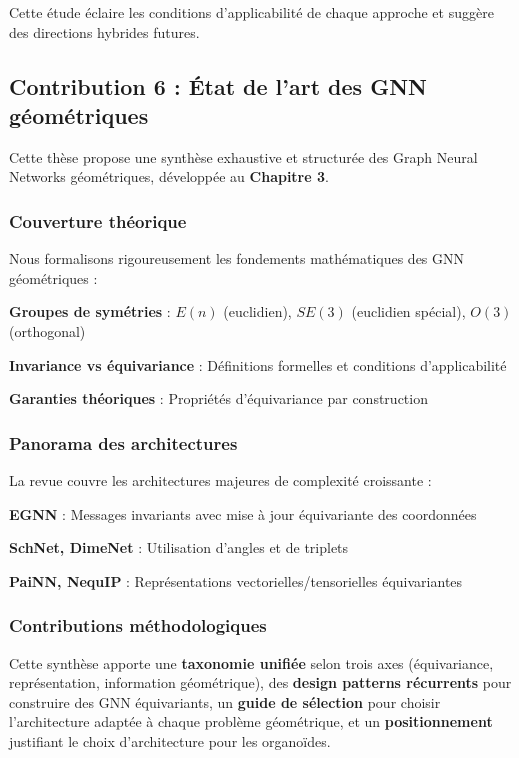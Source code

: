 Cette étude éclaire les conditions d'applicabilité de chaque approche et suggère des directions hybrides futures.

\subsection{Contribution 6 : État de l'art des GNN géométriques}

Cette thèse propose une synthèse exhaustive et structurée des Graph Neural Networks géométriques, développée au \textbf{Chapitre 3}.

\subsubsection{Couverture théorique}

Nous formalisons rigoureusement les fondements mathématiques des GNN géométriques :

\textbf{Groupes de symétries} : $E(n)$ (euclidien), $SE(3)$ (euclidien spécial), $O(3)$ (orthogonal)

\textbf{Invariance vs équivariance} : Définitions formelles et conditions d'applicabilité

\textbf{Garanties théoriques} : Propriétés d'équivariance par construction

\subsubsection{Panorama des architectures}

La revue couvre les architectures majeures de complexité croissante :

\textbf{EGNN} : Messages invariants avec mise à jour équivariante des coordonnées

\textbf{SchNet, DimeNet} : Utilisation d'angles et de triplets

\textbf{PaiNN, NequIP} : Représentations vectorielles/tensorielles équivariantes

\subsubsection{Contributions méthodologiques}

Cette synthèse apporte une \textbf{taxonomie unifiée} selon trois axes (équivariance, représentation, information géométrique), des \textbf{design patterns récurrents} pour construire des GNN équivariants, un \textbf{guide de sélection} pour choisir l'architecture adaptée à chaque problème géométrique, et un \textbf{positionnement} justifiant le choix d'architecture pour les organoïdes.

